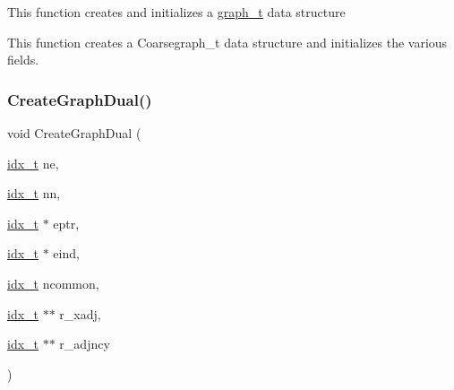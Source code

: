 This function creates and initializes a \hyperlink{a00734}{graph\+\_\+t} data structure

This function creates a Coarsegraph\+\_\+t data structure and initializes the various fields. \mbox{\label{a00945_a10400dffe4954a697990134da62b387d}} 
\subsubsection{\texorpdfstring{Create\+Graph\+Dual()}{CreateGraphDual()}}
{\footnotesize\ttfamily void Create\+Graph\+Dual (\begin{DoxyParamCaption}\item[{\hyperlink{a00876_aaa5262be3e700770163401acb0150f52}{idx\+\_\+t}}]{ne,  }\item[{\hyperlink{a00876_aaa5262be3e700770163401acb0150f52}{idx\+\_\+t}}]{nn,  }\item[{\hyperlink{a00876_aaa5262be3e700770163401acb0150f52}{idx\+\_\+t} $\ast$}]{eptr,  }\item[{\hyperlink{a00876_aaa5262be3e700770163401acb0150f52}{idx\+\_\+t} $\ast$}]{eind,  }\item[{\hyperlink{a00876_aaa5262be3e700770163401acb0150f52}{idx\+\_\+t}}]{ncommon,  }\item[{\hyperlink{a00876_aaa5262be3e700770163401acb0150f52}{idx\+\_\+t} $\ast$$\ast$}]{r\+\_\+xadj,  }\item[{\hyperlink{a00876_aaa5262be3e700770163401acb0150f52}{idx\+\_\+t} $\ast$$\ast$}]{r\+\_\+adjncy }\end{DoxyParamCaption})}

